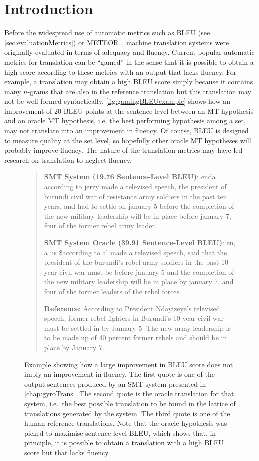 
\section{Introduction}

Before the widespread use of automatic metrics such as
BLEU (see \autoref{sec:evaluationMetrics}) or
METEOR~\citep{banerjee-lavie:2005:MTSumm}, machine translation
systems were originally evaluated in terms of adequacy
and fluency.
Current popular automatic metrics for translation can be ``gamed'' in the
sense that it is possible to obtain a high score according to these
metrics with an output that lacks fluency.
For example, a translation may obtain a high BLEU score simply
because it contains many $n$-grams that are also in the reference
translation but this translation may not be well-formed syntactically.
\autoref{fig:gamingBLEUexample} shows how an improvement of
20 BLEU points at the sentence level between an MT hypothesis
and an oracle MT hypothesis, i.e. the best performing hypothesis among a set, may
not translate into
an improvement in fluency. Of course, BLEU is designed to
measure quality at the set level, so hopefully other oracle MT
hypotheses will probably improve fluency.
The nature of the translation metrics may have led research on translation to neglect fluency.
%
\begin{figure}
\begin{quote}
  \textbf{SMT System (19.76 Sentence-Level BLEU)}: enda according to jerzy made a televised speech, the president of burundi civil war of resistance army soldiers in the past ten years, and had to settle on january 5 before the completion of the new military leadership will be in place before january 7, four of the former rebel army leader.

  \textbf{SMT System Oracle (39.91 Sentence-Level BLEU)}: en, a us \$according to al made a televised speech, said that the president of the burundi's rebel army soldiers in the past 10-year civil war must be before january 5 and the completion of the new military leadership will be in place by january 7, and four of the former leaders of the rebel forces.

  \textbf{Reference}: According to President Ndayizeye's televised speech, former rebel fighters in Burundi's 10-year civil war must be settled in by January 5.  The new army leadership is to be made up of 40 percent former rebels and should be in place by January 7.
\end{quote}
\caption{Example showing how a large improvement in BLEU score does not imply an improvement in fluency.
  The first quote is one of the output sentences produced by an SMT system presented in \autoref{chap:gyroTrans}.
  The second quote is the oracle translation for that system, i.e.\ the best possible translation to be found
  in the lattice of translations generated by the system. The third quote is one of the human reference translations.
  Note that the oracle hypothesis was picked to maximise sentence-level BLEU, which shows that, in principle, it is
  possible to obtain a translation with a high BLEU score but that lacks fluency.
}
\label{fig:gamingBLEUexample}
\end{figure}

